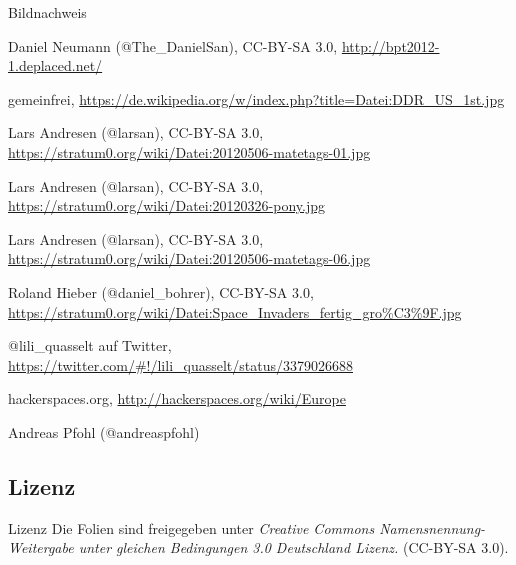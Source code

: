 \documentclass[hyperref={pdfpagelabels=false}]{beamer}
\begin{document}
\begin{frame}{Bildnachweis}
    \footnotesize
    \begin{description}[Folie XX]
        \item[Folie \ref{secbaellebad}] Daniel Neumann (@The\_DanielSan), CC-BY-SA 3.0, {\tiny \url{http://bpt2012-1.deplaced.net/}}
        \item[Folie \ref{secddr}] gemeinfrei, {\tiny \url{https://de.wikipedia.org/w/index.php?title=Datei:DDR\_US\_1st.jpg}}
        \item[Folie \ref{secmatetags}] Lars Andresen (@larsan), CC-BY-SA 3.0, {\tiny \url{https://stratum0.org/wiki/Datei:20120506-matetags-01.jpg}}
        \item[Folie \ref{secpony}] Lars Andresen (@larsan), CC-BY-SA 3.0, {\tiny \url{https://stratum0.org/wiki/Datei:20120326-pony.jpg}}
        \item[Folie \ref{secreprap}] Lars Andresen (@larsan), CC-BY-SA 3.0, {\tiny \url{https://stratum0.org/wiki/Datei:20120506-matetags-06.jpg}}
        \item[Folie \ref{secinvaders}] Roland Hieber (@daniel\_bohrer), CC-BY-SA 3.0, {\tiny \url{https://stratum0.org/wiki/Datei:Space\_Invaders\_fertig\_gro\%C3\%9F.jpg}}
        \item[Folie \ref{secgeschichte}] @lili\_quasselt auf Twitter,
            {\tiny \url{https://twitter.com/\#!/lili\_quasselt/status/3379026688}}
        \item[Folie \ref{secmap}] hackerspaces.org, {\tiny \url{http://hackerspaces.org/wiki/Europe}}
        \item[Folie \ref{secgruendung}] Andreas Pfohl (@andreaspfohl)
    \end{description}
    \normalsize
\end{frame}

\subsection{Lizenz}

\begin{frame}{Lizenz}
    Die Folien sind freigegeben unter \emph{Creative Commons
    Namensnennung-Weitergabe unter gleichen Bedingungen 3.0 Deutschland
    Lizenz.} (CC-BY-SA 3.0).
\end{frame}
\end{document}
